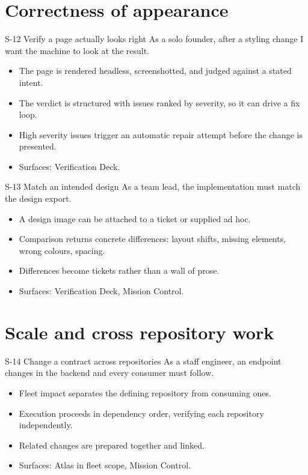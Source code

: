 \section{Correctness of appearance}

\begin{story}{S-12 \quad Verify a page actually looks right}
As a solo founder, after a styling change I want the machine to look at the result.
\end{story}
\begin{itemize}
  \item The page is rendered headless, screenshotted, and judged against a stated intent.
  \item The verdict is structured with issues ranked by severity, so it can drive a fix loop.
  \item High severity issues trigger an automatic repair attempt before the change is
  presented.
  \item Surfaces: Verification Deck.
\end{itemize}

\begin{story}{S-13 \quad Match an intended design}
As a team lead, the implementation must match the design export.
\end{story}
\begin{itemize}
  \item A design image can be attached to a ticket or supplied ad hoc.
  \item Comparison returns concrete differences: layout shifts, missing elements, wrong
  colours, spacing.
  \item Differences become tickets rather than a wall of prose.
  \item Surfaces: Verification Deck, Mission Control.
\end{itemize}

\section{Scale and cross repository work}

\begin{story}{S-14 \quad Change a contract across repositories}
As a staff engineer, an endpoint changes in the backend and every consumer must follow.
\end{story}
\begin{itemize}
  \item Fleet impact separates the defining repository from consuming ones.
  \item Execution proceeds in dependency order, verifying each repository independently.
  \item Related changes are prepared together and linked.
  \item Surfaces: Atlas in fleet scope, Mission Control.
\end{itemize}

